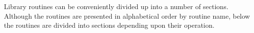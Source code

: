 Library routines can be conveniently divided
up into a number of sections. Although the routines are
presented in alphabetical order by routine name,
below the routines are divided into sections
depending upon their operation.

